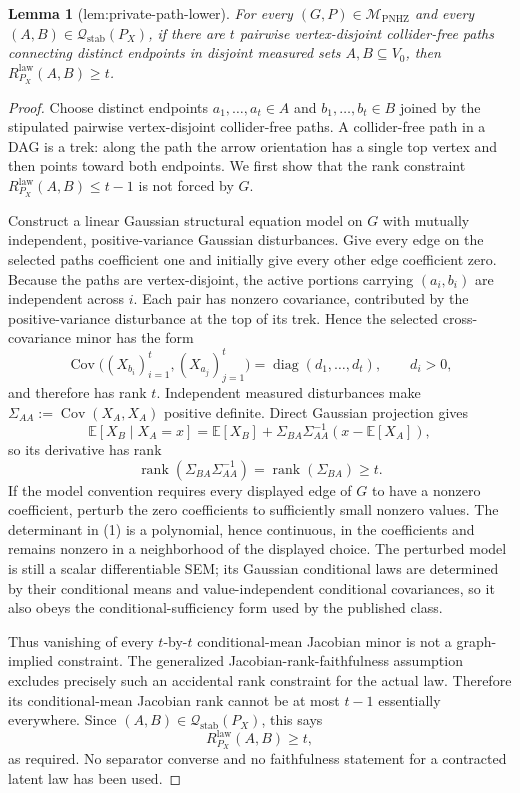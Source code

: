 \documentclass{article}
\newtheorem{lemma}{Lemma}
\begin{document}
\begin{lemma}[lem:private-path-lower]\label{lem:private-path-lower}
For every \((G,P)\in\mathcal M_{\mathrm{PNHZ}}\) and every \((A,B)\in\mathcal Q_{\mathrm{stab}}(P_X)\), if there are \(t\) pairwise vertex-disjoint collider-free paths connecting distinct endpoints in disjoint measured sets \(A,B\subseteq V_0\), then \(R^{\mathrm{law}}_{P_X}(A,B)\ge t\).
\end{lemma}
\begin{proof}
Choose distinct endpoints \(a_1,\ldots,a_t\in A\) and \(b_1,\ldots,b_t\in B\) joined by the stipulated pairwise vertex-disjoint collider-free paths.  A collider-free path in a DAG is a trek: along the path the arrow orientation has a single top vertex and then points toward both endpoints.  We first show that the rank constraint \(R^{\mathrm{law}}_{P_X}(A,B)\leq t-1\) is not forced by \(G\).

Construct a linear Gaussian structural equation model on \(G\) with mutually independent, positive-variance Gaussian disturbances.  Give every edge on the selected paths coefficient one and initially give every other edge coefficient zero.  Because the paths are vertex-disjoint, the active portions carrying \((a_i,b_i)\) are independent across \(i\).  Each pair has nonzero covariance, contributed by the positive-variance disturbance at the top of its trek.  Hence the selected cross-covariance minor has the form
\[
 \operatorname{Cov}\bigl((X_{b_i})_{i=1}^t,(X_{a_j})_{j=1}^t\bigr)
 =\operatorname{diag}(d_1,\ldots,d_t),
 \qquad d_i>0, \tag{1}
\]
and therefore has rank \(t\).  Independent measured disturbances make \(\Sigma_{AA}:=\operatorname{Cov}(X_A,X_A)\) positive definite.  Direct Gaussian projection gives
\[
 \mathbb E[X_B\mid X_A=x]
 =\mathbb E[X_B]+\Sigma_{BA}\Sigma_{AA}^{-1}(x-\mathbb E[X_A]), \tag{2}
\]
so its derivative has rank
\[
 \operatorname{rank}(\Sigma_{BA}\Sigma_{AA}^{-1})
 =\operatorname{rank}(\Sigma_{BA})\geq t. \tag{3}
\]
If the model convention requires every displayed edge of \(G\) to have a nonzero coefficient, perturb the zero coefficients to sufficiently small nonzero values.  The determinant in (1) is a polynomial, hence continuous, in the coefficients and remains nonzero in a neighborhood of the displayed choice.  The perturbed model is still a scalar differentiable SEM; its Gaussian conditional laws are determined by their conditional means and value-independent conditional covariances, so it also obeys the conditional-sufficiency form used by the published class.

Thus vanishing of every \(t\)-by-\(t\) conditional-mean Jacobian minor is not a graph-implied constraint.  The generalized Jacobian-rank-faithfulness assumption excludes precisely such an accidental rank constraint for the actual law.  Therefore its conditional-mean Jacobian rank cannot be at most \(t-1\) essentially everywhere.  Since \((A,B)\in\mathcal Q_{\mathrm{stab}}(P_X)\), this says
\[
 R^{\mathrm{law}}_{P_X}(A,B)\geq t,
\]
as required.  No separator converse and no faithfulness statement for a contracted latent law has been used.
\end{proof}
\end{document}
